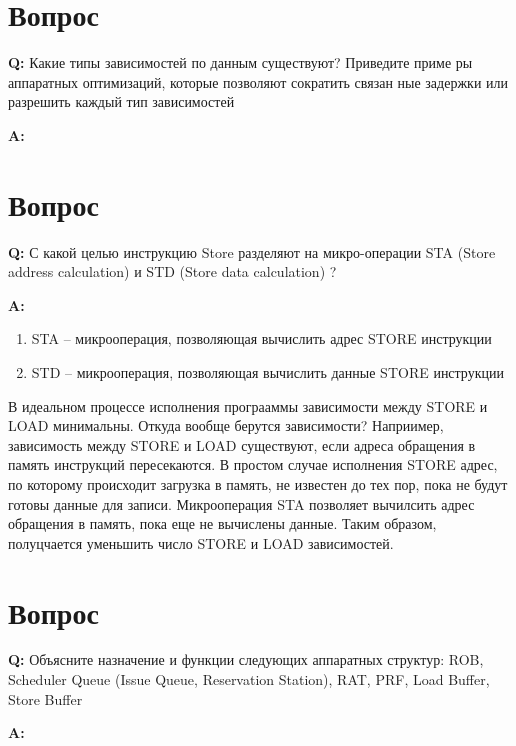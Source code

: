 \documentclass[12pt, letterpaper]{article}
\begin{document}
\newpage

\section{Вопрос}

\textbf{Q: } Какие типы зависимостей по данным существуют? Приведите приме
ры аппаратных оптимизаций, которые позволяют сократить связан
ные задержки или разрешить каждый тип зависимостей

\textbf{A: }


\newpage

\section{Вопрос}

\textbf{Q: } С какой целью инструкцию Store разделяют на микро-операции STA
(Store address calculation) и STD (Store data calculation) ?

\textbf{A: }

\begin{enumerate}
    \item STA -- микрооперация, позволяющая вычислить адрес STORE инструкции
    \item STD -- микрооперация, позволяющая вычислить данные STORE инструкции
\end{enumerate}

В идеальном процессе исполнения програаммы зависимости между STORE и LOAD минимальны. Откуда вообще берутся зависимости? Наприимер, зависимость между STORE и LOAD
существуют, если адреса обращения в память инструкций пересекаются. В простом случае исполнения STORE адрес, по которому происходит загрузка в память, не известен до тех пор, пока не будут готовы данные для записи.
Микрооперация STA позволяет вычилсить адрес обращения в память, пока еще не вычислены данные. Таким образом, полуцчается уменьшить число STORE и LOAD зависимостей.

\newpage

\section{Вопрос}

\textbf{Q: } Объясните назначение и функции следующих аппаратных структур:
ROB, Scheduler Queue (Issue Queue, Reservation Station), RAT, PRF, Load Buffer, Store Buffer

\textbf{A: }
\end{document}
